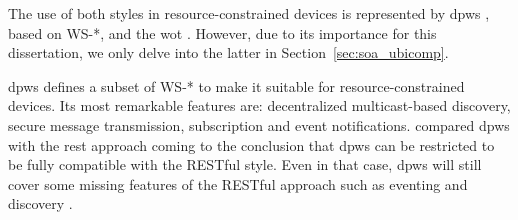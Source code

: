 
\bigskip

The use of both styles in resource-constrained devices is represented by
\ac{dpws} \citep{moritz_devices_2010}, based on WS-*, and the \ac{wot} \citep{guinard_internet_2011}.
However, due to its importance for this dissertation, we only delve into the latter in Section~\ref{sec:soa_ubicomp}. %

\ac{dpws} defines a subset of WS-* to make it suitable for resource-constrained devices.
Its most remarkable features are: decentralized multicast-based discovery, secure message transmission, subscription and event notifications.
\citet{moritz_devices_2010} compared \ac{dpws} with the \ac{rest} approach coming to the conclusion that \ac{dpws} can be restricted to be fully compatible with the RESTful style.
Even in that case, \ac{dpws} will still cover some missing features of the RESTful approach such as eventing and discovery \citep{moritz_devices_2010}.



